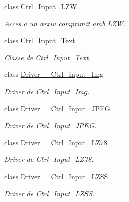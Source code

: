 \begin{DoxyCompactItemize}
class \hyperlink{classpersistencia_1_1input_1_1Ctrl__Input__LZW}{Ctrl\+\_\+\+Input\+\_\+\+L\+ZW}
\begin{DoxyCompactList}\small\item\em Acces a un arxiu comprimit amb L\+ZW. \end{DoxyCompactList}\item 
class \hyperlink{classpersistencia_1_1input_1_1Ctrl__Input__Text}{Ctrl\+\_\+\+Input\+\_\+\+Text}
\begin{DoxyCompactList}\small\item\em Classe de \hyperlink{classpersistencia_1_1input_1_1Ctrl__Input__Text}{Ctrl\+\_\+\+Input\+\_\+\+Text}. \end{DoxyCompactList}\item 
class \hyperlink{classpersistencia_1_1input_1_1Driver____Ctrl__Input__Img}{Driver\+\_\+\+\_\+\+Ctrl\+\_\+\+Input\+\_\+\+Img}
\begin{DoxyCompactList}\small\item\em Driver de \hyperlink{classpersistencia_1_1input_1_1Ctrl__Input__Img}{Ctrl\+\_\+\+Input\+\_\+\+Img}. \end{DoxyCompactList}\item 
class \hyperlink{classpersistencia_1_1input_1_1Driver____Ctrl__Input__JPEG}{Driver\+\_\+\+\_\+\+Ctrl\+\_\+\+Input\+\_\+\+J\+P\+EG}
\begin{DoxyCompactList}\small\item\em Driver de \hyperlink{classpersistencia_1_1input_1_1Ctrl__Input__JPEG}{Ctrl\+\_\+\+Input\+\_\+\+J\+P\+EG}. \end{DoxyCompactList}\item 
class \hyperlink{classpersistencia_1_1input_1_1Driver____Ctrl__Input__LZ78}{Driver\+\_\+\+\_\+\+Ctrl\+\_\+\+Input\+\_\+\+L\+Z78}
\begin{DoxyCompactList}\small\item\em Driver de \hyperlink{classpersistencia_1_1input_1_1Ctrl__Input__LZ78}{Ctrl\+\_\+\+Input\+\_\+\+L\+Z78}. \end{DoxyCompactList}\item 
class \hyperlink{classpersistencia_1_1input_1_1Driver____Ctrl__Input__LZSS}{Driver\+\_\+\+\_\+\+Ctrl\+\_\+\+Input\+\_\+\+L\+Z\+SS}
\begin{DoxyCompactList}\small\item\em Driver de \hyperlink{classpersistencia_1_1input_1_1Ctrl__Input__LZSS}{Ctrl\+\_\+\+Input\+\_\+\+L\+Z\+SS}. \end{DoxyCompactList}\item 

\end{DoxyCompactItemize}
